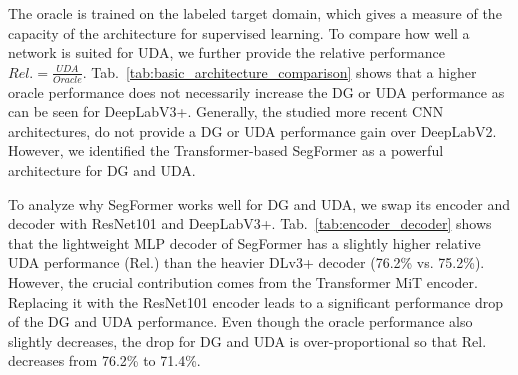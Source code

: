\documentclass[journal,compsoc]{IEEEtran}
\begin{document}
The oracle is trained on the labeled target domain, which gives a measure of the capacity of the architecture for supervised learning. 
To compare how well a network is suited for UDA, we further provide the relative performance $\mathit{Rel.} {=} \frac{\mathit{UDA}}{\mathit{Oracle}}$. 
Tab.~\ref{tab:basic_architecture_comparison} shows that a higher oracle performance does not necessarily increase the DG or UDA performance as can be seen for DeepLabV3+. Generally, the studied more recent CNN architectures, do not provide a DG or UDA performance gain over DeepLabV2. However, we identified the Transformer-based SegFormer as a powerful architecture for DG and UDA.

To analyze why SegFormer works well for DG and UDA, we swap its encoder and decoder with ResNet101 and DeepLabV3+.
Tab.~\ref{tab:encoder_decoder} shows that the lightweight MLP decoder of SegFormer has a slightly higher relative UDA performance (Rel.) than the heavier DLv3+ decoder (76.2\% vs. 75.2\%). However, the crucial contribution comes from the Transformer MiT encoder. Replacing it with the ResNet101 encoder leads to a significant performance drop of the DG and UDA performance. Even though the oracle performance also slightly decreases,
the drop for DG and UDA is over-proportional so that Rel. decreases from 76.2\% to 71.4\%.
\end{document}
